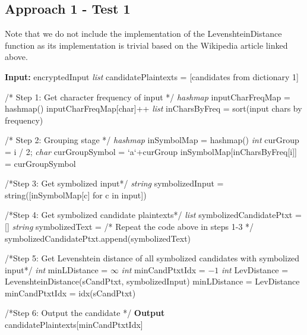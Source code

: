 \documentclass[12pt]{article}
\begin{document}
\subsection{Approach 1 - Test 1}
Note that we do not include the implementation of the LevenshteinDistance function as its implementation is trivial based on the Wikipedia article linked above.
\begin{algorithmic}[1]
\item[\textbf{Input:} encryptedInput]
    \State \emph{list} candidatePlaintexts = [candidates from dictionary 1]
    \item[]

    \State /* Step 1: Get character frequency of input */
    \State \emph{hashmap} inputCharFreqMap = hashmap() 
        \State inputCharFreqMap[char]++
    \EndFor
    \State \emph{list} inCharsByFreq = sort(input chars by frequency)
    \item[]

    \State /* Step 2: Grouping stage */
    \State \emph{hashmap} inSymbolMap = hashmap()
        \State\emph{int} curGroup = i / 2;
        \State\emph{char} curGroupSymbol = `a`+curGroup
        \State inSymbolMap[inCharsByFreq[i]] = curGroupSymbol
    \EndFor

    \item[]
    \State /*Step 3: Get symbolized input*/
    \State \emph{string} symbolizedInput = string([inSymbolMap[c] for c in input])

    \item[]
    \State /*Step 4: Get symbolized candidate plaintexts*/
    \State \emph{list} symbolizedCandidatePtxt = []
        \State \emph{string} symbolizedText = /* Repeat the code above in steps 1-3 */
        symbolizedCandidatePtxt.append(symbolizedText)
    \EndFor

    \item[]
    \State /*Step 5: Get Levenshtein distance of all symbolized candidates with symbolized input*/
    \State \emph{int} minLDistance = $\infty$
    \State \emph{int} minCandPtxtIdx = $-1$
        \State \emph{int} LevDistance = LevenshteinDistance(sCandPtxt, symbolizedInput) 
            \State minLDistance = LevDistance 
            \State minCandPtxtIdx = idx(sCandPtxt)
        \EndIf
    \EndFor

    \item[]
    \State /*Step 6: Output the candidate */
    \State \textbf{Output} candidatePlaintexts[minCandPtxtIdx]
\end{algorithmic}
\end{document}
